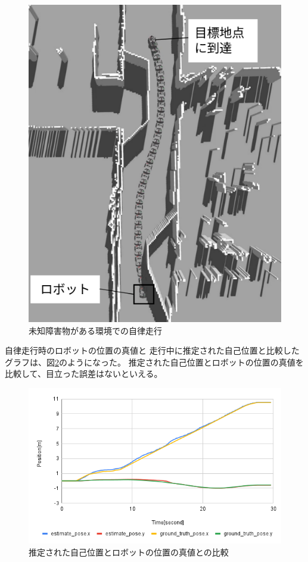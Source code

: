 \begin{figure}[H]
  \begin{center}
    \includegraphics[width=0.5\linewidth]{figs/no_implementation_no_reset.png}
    \caption{未知障害物がある環境での自律走行}
    \label{fig:nav_imp}
  \end{center}
\end{figure}

自律走行時のロボットの位置の真値と
走行中に推定された自己位置と比較したグラフは、図\ref{fig:odom_comp_imp}のようになった。
推定された自己位置とロボットの位置の真値を比較して、目立った誤差はないといえる。

\begin{figure}[H]
  \begin{center}
    \includegraphics[width=0.98\linewidth]{figs/sim_imp_ground_truth.png}
    \caption{推定された自己位置とロボットの位置の真値との比較}
    \label{fig:odom_comp_imp}
  \end{center}
\end{figure}

